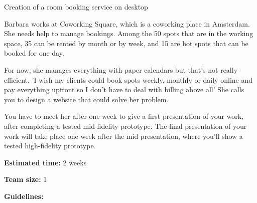 \makeheaderfiles

Creation of a room booking service on desktop

Barbara works at Coworking Square, which is a coworking place in Amsterdam.
She needs help to manage bookings. Among the 50 spots that are in the working space, 35 can be rented by month or by week, and 15 are hot spots that can be booked for one day.

For now, she manages everything with paper calendars but that's not really efficient.
'I wish my clients could book spots weekly, monthly or daily online and pay everything upfront so I don't have to deal with billing above all'
She calls you to design a website that could solve her problem.

You have to meet her after one week to give a first presentation of your work, after completing a tested mid-fidelity prototype.
The final presentation of your work will take place one week after the mid presentation, where you'll show a tested high-fidelity prototype.

\textbf{Estimated time:} 2 weeks

\textbf{Team size:} 1

\textbf{Guidelines:}

